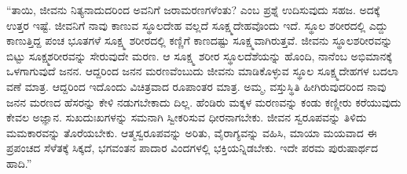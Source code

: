 “ತಾಯಿ, ಜೀವನು ನಿತ್ಯನಾದುದರಿಂದ ಅವನಿಗೆ ಜರಾಮರಣಗಳೆಂತು? ಎಂಬ ಪ್ರಶ್ನೆ ಉದಿಸುವುದು ಸಹಜ. ಅದಕ್ಕೆ ಉತ್ತರ ಇಷ್ಟೆ. ಜೀವನಿಗೆ ನಾವು ಕಾಣುವ ಸ್ಥೂಲದೇಹ ವಲ್ಲದೆ ಸೂಕ್ಷ್ಮದೇಹವೊಂದು ಇದೆ. ಸ್ಥೂಲ ಶರೀರದಲ್ಲಿ ಎದ್ದು ಕಾಣುತ್ತಿದ್ದ ಪಂಚ ಭೂತಗಳೆ ಸೂಕ್ಷ್ಮ ಶರೀರದಲ್ಲಿ ಕಣ್ಣಿಗೆ ಕಾಣದಷ್ಟು ಸೂಕ್ಷ್ಮವಾಗಿರುತ್ತವೆ. ಜೀವನು ಸ್ಥೂಲಶರೀರವನ್ನು ಬಿಟ್ಟು ಸೂಕ್ಷ್ಮಶರೀರವನ್ನು ಸೇರುವುದೇ ಮರಣ. ಆ ಸೂಕ್ಷ್ಮ ಶರೀರ ಸ್ಥೂಲದೆಶೆಯನ್ನು ಹೊಂದಿ, ನಾನೆಂಬ ಅಭಿಮಾನಕ್ಕೆ ಒಳಗಾಗುವುದೆ ಜನನ. ಆದ್ದರಿಂದ ಜನನ ಮರಣವೆಂಬುದು ಜೀವನು ಮಾಡಿಕೊಳ್ಳುವ ಸ್ಥೂಲ ಸೂಕ್ಷ್ಮದೇಹಗಳ ಬದಲಾ ವಣೆ ಮಾತ್ರ. ಆದ್ದರಿಂದ ಇದೊಂದು ವಿಚಿತ್ರವಾದ ರೂಪಾಂತರ ಮಾತ್ರ. ಅಮ್ಮ, ವಸ್ತುಸ್ಥಿತಿ ಹೀಗಿರುವುದರಿಂದ ನಾವು ಜನನ ಮರಣದ ಹೆಸರನ್ನು ಕೇಳಿ ನಡುಗಬೇಕಾದು ದಿಲ್ಲ. ಹೆಂಡಿರು ಮಕ್ಕಳ ಮರಣವನ್ನು ಕಂಡು ಕಣ್ಣೀರು ಕರೆಯುವುದು ಕೇವಲ ಅಜ್ಞಾನ. ಸುಖದುಃಖಗಳನ್ನು ಸಮನಾಗಿ ಸ್ವೀಕರಿಸುವ ಧೀರನಾಗಬೇಕು. ಜೀವನ ಸ್ವರೂಪವನ್ನು ತಿಳಿದು ಮಮಕಾರವನ್ನು ತೊರೆಯಬೇಕು. ಆತ್ಮಸ್ವರೂಪವನ್ನು ಅರಿತು, ವೈರಾಗ್ಯವನ್ನು ವಹಿಸಿ, ಮಾಯಾ ಮಯವಾದ ಈ ಪ್ರಪಂಚದ ಸೆಳೆತಕ್ಕೆ ಸಿಕ್ಕದೆ, ಭಗವಂತನ ಪಾದಾರ ವಿಂದಗಳಲ್ಲಿ ಭಕ್ತಿಯನ್ನಿಡಬೇಕು. ಇದೇ ಪರಮ ಪುರುಷಾರ್ಥದ ಹಾದಿ.”

